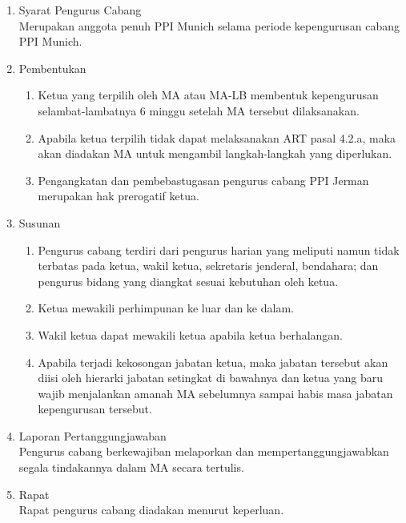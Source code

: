 \documentclass{article}
\begin{document}
\begin{enumerate}
    \item {
        Syarat Pengurus Cabang \\
        Merupakan anggota penuh PPI Munich selama periode kepengurusan cabang PPI Munich.
    }
    \item {
        Pembentukan 
        \begin{enumerate}
            \item {
                Ketua yang terpilih oleh MA atau MA-LB membentuk kepengurusan selambat-lambatnya 6 minggu setelah MA tersebut dilaksanakan.
            }
            \item {
                Apabila ketua terpilih tidak dapat melaksanakan ART pasal 4.2.a, maka akan diadakan MA untuk mengambil langkah-langkah yang diperlukan.
            }
            \item {
                Pengangkatan dan pembebastugasan pengurus cabang PPI Jerman merupakan hak prerogatif ketua.
            }
        \end{enumerate}
    }
    \item {
        Susunan 
        \begin{enumerate}
            \item {
                Pengurus cabang terdiri dari pengurus harian yang meliputi namun tidak terbatas pada ketua, wakil ketua, sekretaris jenderal, bendahara; dan pengurus bidang yang diangkat sesuai kebutuhan oleh ketua.
            }
            \item {
                Ketua mewakili perhimpunan ke luar dan ke dalam.
            }
            \item {
                Wakil ketua dapat mewakili ketua apabila ketua berhalangan.
            }
            \item {
                Apabila terjadi kekosongan jabatan ketua, maka jabatan tersebut akan diisi oleh hierarki jabatan setingkat di bawahnya dan ketua yang baru wajib menjalankan amanah MA sebelumnya sampai habis masa jabatan kepengurusan tersebut.
            }
        \end{enumerate}
    }
    \item {
        Laporan Pertanggungjawaban \\
        Pengurus cabang berkewajiban melaporkan dan mempertanggungjawabkan segala tindakannya dalam MA secara tertulis.
    }
    \item {
        Rapat \\
        Rapat pengurus cabang diadakan menurut keperluan.
    }
\end{enumerate}
\end{document}

